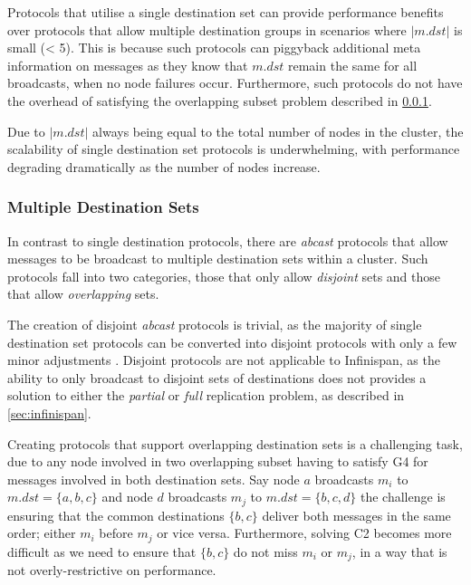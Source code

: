         Protocols that utilise a single destination set can provide performance benefits over protocols that allow multiple destination groups in scenarios where $\left\vert{m.dst}\right\vert$ is small (< 5).  This is because such protocols can piggyback additional meta information on messages as they know that $m.dst$ remain the same for all broadcasts, when no node failures occur.  Furthermore, such protocols do not have the overhead of satisfying the overlapping subset problem described in \ref{ssec:overlapping}.  
        
        Due to $\left\vert{m.dst}\right\vert$ always being equal to the total number of nodes in the cluster, the scalability of single destination set protocols is underwhelming, with performance degrading dramatically as the number of nodes increase.  
        
        \subsubsection{Multiple Destination Sets}\label{ssec:overlapping}
        In contrast to single destination protocols, there are \emph{abcast} protocols that allow messages to be broadcast to multiple destination sets within a cluster.  Such protocols fall into two categories, those that only allow \emph{disjoint} sets and those that allow \emph{overlapping} sets.  
        
        The creation of disjoint \emph{abcast} protocols is trivial, as the majority of single destination set protocols can be converted into disjoint protocols with only a few minor adjustments \cite{Defago:2004:TOB:1041680.1041682}.  Disjoint protocols are not applicable to Infinispan, as the ability to only broadcast to disjoint sets of destinations does not provides a solution to either the \emph{partial} or \emph{full} replication problem, as described in \ref{sec:infinispan}.  
        
        Creating protocols that support overlapping destination sets is a challenging task, due to any node involved in two overlapping subset having to satisfy G4 for messages involved in both destination sets.  Say node $a$ broadcasts $m_i$ to $m.dst = \{a,b,c\}$ and node $d$ broadcasts $m_j$ to $m.dst = \{b,c,d\}$ the challenge is ensuring that the common destinations $\{b,c\}$ deliver both messages in the same order; either $m_i$ before $m_j$ or vice versa.  Furthermore, solving C2 becomes more difficult as we need to ensure that $\{b,c\}$ do not miss $m_i$ or $m_j$, in a way that is not overly-restrictive on performance.  
        

